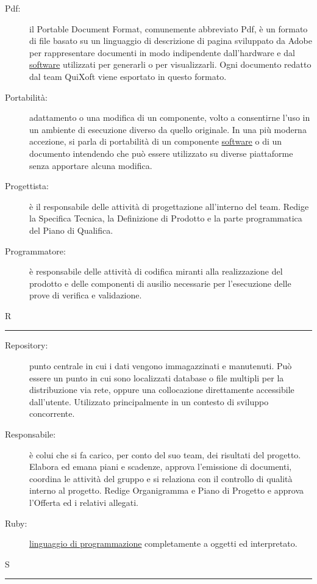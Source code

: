 \documentclass[11pt,a4paper]{article}
\begin{document}
\begin{description}
	\item[Pdf:] il Portable Document Format, comunemente abbreviato Pdf, è un formato di file basato su un linguaggio di descrizione di pagina sviluppato da Adobe per rappresentare documenti in modo indipendente dall'hardware e dal \underline{software} utilizzati per generarli o per visualizzarli. Ogni documento redatto dal team QuiXoft viene esportato in questo formato.
	\item[Portabilità:] adattamento o una modifica di un componente, volto a consentirne l'uso in un ambiente di esecuzione diverso da quello originale. In una più moderna accezione, si parla di portabilità di un componente \underline{software} o di un documento intendendo che può essere utilizzato su diverse piattaforme senza apportare alcuna modifica.
	\item[Progettista:] è il responsabile delle attività di progettazione all'interno del team. Redige la Specifica Tecnica, la Definizione di Prodotto e la parte programmatica del Piano di Qualifica.
	\item[Programmatore:] è responsabile delle attività di codifica miranti alla realizzazione del prodotto e delle componenti di ausilio necessarie per l'esecuzione delle prove di verifica e validazione.
\end{description}
\bigskip
\Huge R \bigskip
\hrule
\smallskip
\normalsize
\begin{description}
	\item[Repository:] punto centrale in cui i dati vengono immagazzinati e manutenuti. Può essere un punto in cui sono localizzati database o file multipli per la distribuzione via rete, oppure una collocazione direttamente accessibile dall'utente. Utilizzato principalmente in un contesto di sviluppo concorrente.
	\item[Responsabile:] è colui che si fa carico, per conto del suo team, dei risultati del progetto. Elabora ed emana piani e scadenze, approva l'emissione di documenti, coordina le attività del gruppo e si relaziona con il controllo di qualità interno al progetto. Redige Organigramma e Piano di Progetto e approva l'Offerta ed i relativi allegati.
	\item[Ruby:] \underline{linguaggio di programmazione} completamente a oggetti ed interpretato.
\end{description}
\bigskip
\Huge S \bigskip
\hrule
\smallskip
\normalsize
\end{document}
